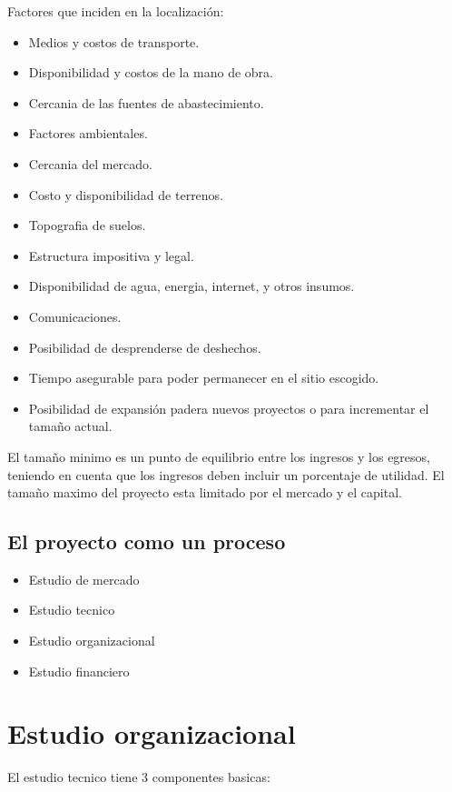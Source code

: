 \documentclass[a4paper, 11pt, oneside]{article}
\begin{document}
Factores que inciden en la localización:

\begin{itemize}
	\item Medios y costos de transporte.
	\item Disponibilidad y costos de la mano de obra.
	\item Cercania de las fuentes de abastecimiento.
	\item Factores ambientales.
	\item Cercania del mercado.
	\item Costo y disponibilidad de terrenos.
	\item Topografia de suelos.
	\item Estructura impositiva y legal.
	\item Disponibilidad de agua, energia, internet, y otros insumos.
	\item Comunicaciones.
	\item Posibilidad de desprenderse de deshechos.
	\item Tiempo asegurable para poder permanecer en el sitio escogido.
	\item Posibilidad de expansión padera nuevos proyectos o para incrementar el tamaño actual.
\end{itemize} 

El tamaño minimo es un punto de equilibrio entre los ingresos y los egresos, teniendo en cuenta que los ingresos deben incluir un 
porcentaje de utilidad. El tamaño maximo del proyecto esta limitado por el mercado y el capital.

\subsection{El proyecto como un proceso}

\begin{itemize}
	\item Estudio de mercado
	\item Estudio tecnico
	\item Estudio organizacional
	\item Estudio financiero
\end{itemize}

\section{Estudio organizacional}

El estudio tecnico tiene 3 componentes basicas:
\end{document}
